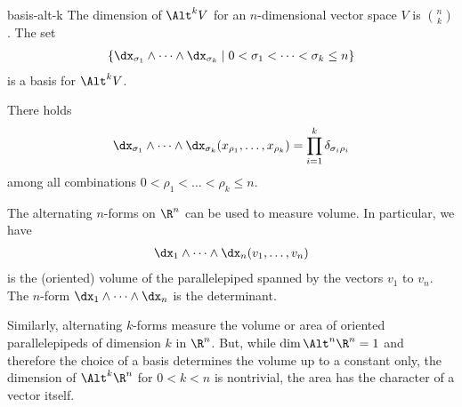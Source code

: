 \begin{Lemma}{basis-alt-k}
  The dimension of $\Alt^k V$ for an $n$-dimensional vector space $V$
  is $\binom nk$. The set
  \begin{gather}
    \left\{ \dx_{\sigma_1}\wedge\dots\wedge\dx_{\sigma_k} \;\middle|\;
      0<\sigma_1 < \dots < \sigma_k\le n \right\}
  \end{gather}
  is a basis for $\Alt^k V$.
\end{Lemma}
\begin{todo}
  There holds
  \begin{gather}
    \dx_{\sigma_1}\wedge\dots\wedge\dx_{\sigma_k} (x_{\rho_1},\dots,x_{\rho_k})
    = \prod_{i=1}^k \delta_{\sigma_i\rho_i}
  \end{gather}
  among all combinations $0<\rho_1 < \dots < \rho_k\le n$.
\end{todo}

\begin{remark}
  The alternating $n$-forms on $\R^n$ can be used to measure volume. In particular,
  we have
  \begin{gather}
    \dx_1\wedge\dots\wedge \dx_n(v_1,\dots,v_n)
  \end{gather}
  is the (oriented) volume of the parallelepiped spanned by the
  vectors $v_1$ to $v_n$. The $n$-form $\dx_1\wedge\dots\wedge \dx_n$ is
  the determinant.

  Similarly, alternating $k$-forms measure the volume or area of oriented
  parallelepipeds of dimension $k$ in $\R^n$. But, while
  $\dim\Alt^n\R^n = 1$ and therefore the choice of a basis determines
  the volume up to a constant only, the dimension of $\Alt^k\R^n$ for
  $0<k<n$ is nontrivial, the area has the character of a vector itself.
\end{remark}

